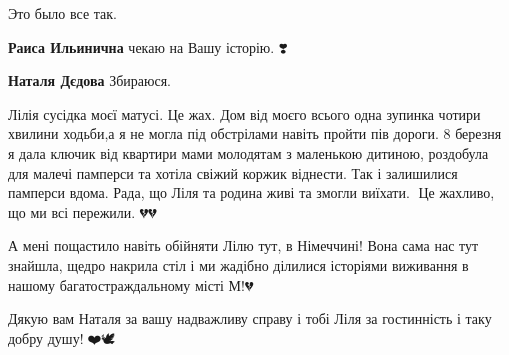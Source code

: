  
 
 
 
 

\qqSecCmt


Это было все так.

\begin{itemize} %
\textbf{Раиса Ильинична} чекаю на Вашу історію. ❣️

\textbf{Наталя Дєдова} Збираюся.
\end{itemize} %


Лілія сусідка моєї матусі. Це жах. Дом від моєго всього одна зупинка чотири
хвилини ходьби,а я не могла під обстрілами навіть пройти пів дороги. 8 березня
я дала ключик від квартири мами молодятам з маленькою дитиною, роздобула для
малечі памперси та хотіла свіжий коржик віднести. Так і залишилися памперси
вдома. Рада, що Ліля та родина живі та змогли виїхати. 🙏Це жахливо, що ми всі
пережили. 💔💔


А мені пощастило навіть обійняти Лілю тут, в Німеччині! Вона сама нас тут
знайшла, щедро накрила стіл і ми жадібно ділилися історіями виживання в нашому
багатостраждальному місті М!💔

Дякую вам Наталя за вашу надважливу справу і тобі Ліля за гостинність і таку
добру душу!🙏❤️🕊️

